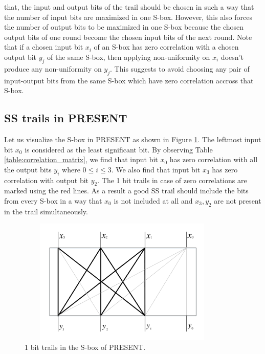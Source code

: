 that, the input and output bits of the trail should be chosen in such a way that the number of input bits are maximized in one S-box. However, this also forces the number of output bits to be maximized in one S-box because the chosen output bits of one round become the chosen input bits of the next round. Note that if a chosen input bit $x_i$ of an S-box has zero correlation with a chosen output bit $y_j$ of the same S-box, then applying non-uniformity on $x_i$ doesn't produce any non-uniformity on $y_j$. This suggests to avoid choosing any pair of input-output bits from the same S-box which have zero correlation accross that S-box.

\subsection{SS trails in PRESENT}
Let us visualize the S-box in PRESENT as shown in Figure \ref{fig:S-box}. The leftmost input bit $x_0$ is considered as the least significant bit. By observing Table \ref{table:correlation_matrix}, we find that input bit $x_0$ has zero correlation with all the output bits $y_i$ where $0\leq i \leq 3$. We also find that input bit $x_3$ has zero correlation with output bit $y_2$. The 1 bit trails in case of zero correlations are marked using the red lines. As a result a good SS trail should include the bits from every S-box in a way that $x_0$ is not included at all and $x_3,y_2$ are not present in the trail simultaneously.
\begin{figure}[h!]
    \centering
    \includegraphics[width=0.9\textwidth,height = 6cm]{images/S-box_PRESENT}
    \caption{1 bit trails in the S-box of PRESENT.}
    \label{fig:S-box}
\end{figure}


